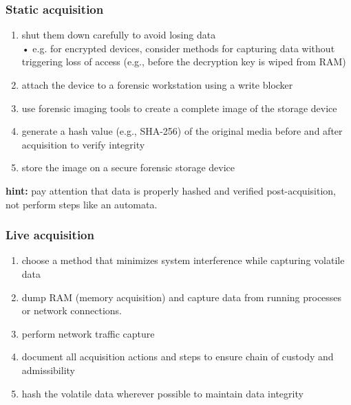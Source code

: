 \subsubsection{Static acquisition}
\begin{enumerate}
    \item shut them down carefully to avoid losing data \\
    • e.g. for encrypted devices, consider methods for capturing data without triggering loss of access (e.g., before the decryption key is wiped from RAM)
    \item attach the device to a forensic workstation using a write blocker
    \item use forensic imaging tools to create a complete image of the storage device
    \item generate a hash value (e.g., SHA-256) of the original media before and after acquisition to verify integrity
    \item store the image on a secure forensic storage device
\end{enumerate}
\textbf{hint:} pay attention that data is properly hashed and verified post-acquisition, not perform steps like an automata.

\subsubsection{Live acquisition}
\begin{enumerate}
    \item choose a method that minimizes system interference while capturing volatile data
    \item dump RAM (memory acquisition) and capture data from running processes or network connections.
    \item perform network traffic capture
    \item document all acquisition actions and steps to ensure chain of custody and admissibility
    \item hash the volatile data wherever possible to maintain data integrity
\end{enumerate}

